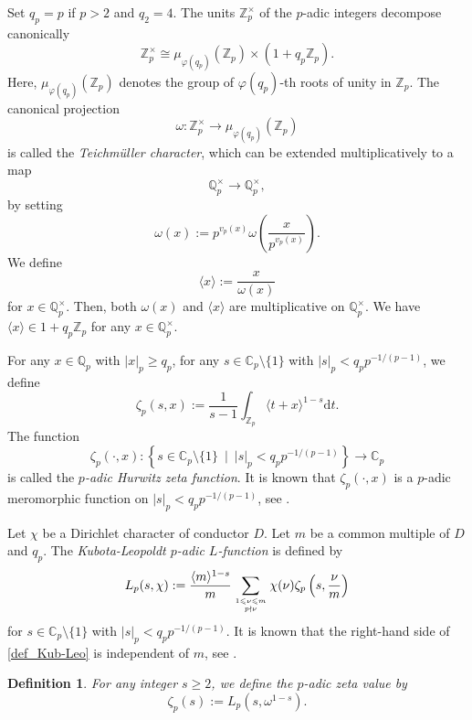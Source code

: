 \documentclass[12pt]{article}
\newtheorem{definition}[theorem]{Definition}
\numberwithin{equation}{section}
\begin{document}
\medskip

Set $q_p = p$ if $p > 2$ and $q_2 = 4$. The units $\mathbb{Z}_p^\times$ of the $p$-adic integers decompose canonically
\[
\mathbb{Z}_p^\times \cong \mu_{\varphi(q_p)}(\mathbb{Z}_p)\times (1+q_p\mathbb{Z}_p).
\]
Here, $\mu_{\varphi(q_p)}(\mathbb{Z}_p)$ denotes the group of $\varphi(q_p)$-th roots of unity in $\mathbb{Z}_p$. The canonical projection
\[
\omega \colon \mathbb{Z}_p^\times \longrightarrow \mu_{\varphi(q_p)}(\mathbb{Z}_p)
\]
is called the \emph{Teichm\"uller character}, which can be extended multiplicatively to a map
\[
\mathbb{Q}_p^\times \longrightarrow \mathbb{Q}_p^\times,
\]
by setting
\[
\omega(x):=p^{v_p(x)}\omega\left(\frac{x}{p^{v_p(x)}}\right).
\]
We define 
\[ \langle x\rangle:=\frac{x}{\omega(x)} \]
for $x\in\mathbb{Q}_p^\times$. Then, both $\omega(x)$ and $\langle x \rangle$ are multiplicative on $\mathbb{Q}_p^\times$. We have $\langle x \rangle \in 1+q_p\mathbb{Z}_p$ for any $x \in \mathbb{Q}_p^\times$.

For any $x \in \mathbb{Q}_p$ with $|x|_p \geqslant q_p$, for any $s \in \mathbb{C}_p \setminus \{ 1 \}$ with $|s|_p < q_pp^{-1/(p-1)}$, we define
\begin{equation}\label{def_Hur}
\zeta_p(s,x) := \frac{1}{s-1} \int_{\mathbb{Z}_p} \langle t+x \rangle^{1-s} \mathrm{d}t.
\end{equation} 
The function
\[ \zeta_p(\cdot,x) \colon \left\{ s \in \mathbb{C}_p \setminus \{ 1\} ~\mid~  |s|_p < q_pp^{-1/(p-1)}  \right\} \longrightarrow \mathbb{C}_p \]
is called the \emph{$p$-adic Hurwitz zeta function}. It is known that $\zeta_p(\cdot,x)$ is a $p$-adic meromorphic function on $|s|_p < q_pp^{-1/(p-1)}$, see \cite[Proposition 11.2.8]{Coh2007}.

\medskip

Let $\chi$ be a Dirichlet character of conductor $D$. Let $m$ be a common multiple of $D$ and $q_p$. The \emph{Kubota-Leopoldt $p$-adic $L$-function} is defined by
\begin{equation}\label{def_Kub-Leo}
L_p(s,\chi) := \frac{\langle m \rangle^{1-s}}{m} \sum_{1 \leqslant \nu \leqslant m \atop p \nmid \nu} \chi(\nu) \zeta_p\left(s,\frac{\nu}{m} \right) 
\end{equation}
for $s \in \mathbb{C}_p \setminus \{ 1 \}$ with $|s|_p < q_pp^{-1/(p-1)}$. It is known that the right-hand side of \eqref{def_Kub-Leo} is independent of $m$, see \cite[Proposition 11.3.8(1)]{Coh2007}.  

\begin{definition}\label{def_p-adic-zeta}
For any integer $s \geqslant 2$, we define the \emph{$p$-adic zeta value} by 
\[ \zeta_p(s) := L_p(s,\omega^{1-s}). \]
\end{definition}
\end{document}
